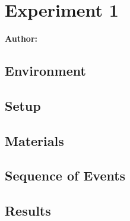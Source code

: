 \chapter{Experiment 1}

\textbf{Author: } 

\section{Environment}

\section{Setup}

\section{Materials}

\section{Sequence of Events}

\section{Results}

\filbreak